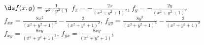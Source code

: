 {$\ds f(x,y) =\frac{1}{x^2+y^2+1}$
}
{$f_x=-\frac{2x}{(x^2+y^2+1)^2}$, $f_y=-\frac{2y}{(x^2+y^2+1)^2}$\\
$f_{xx}=\frac{8x^2}{(x^2+y^2+1)^3}-\frac{2}{(x^2+y^2+1)^2}$, $f_{yy}=\frac{8y^2}{(x^2+y^2+1)^3}-\frac{2}{(x^2+y^2+1)^2}$\\
$f_{xy}=\frac{8xy}{(x^2+y^2+1)^3}$, $f_{yx}=\frac{8xy}{(x^2+y^2+1)^3}$\\
}